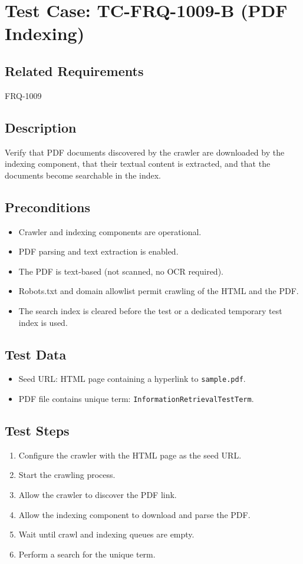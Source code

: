\documentclass{article}
\begin{document}
\section{Test Case: TC-FRQ-1009-B (PDF Indexing)}

\subsection*{Related Requirements}
FRQ-1009

\subsection*{Description}
Verify that PDF documents discovered by the crawler are downloaded by the indexing
component, that their textual content is extracted, and that the documents become
searchable in the index.

\subsection*{Preconditions}
\begin{itemize}
  \item Crawler and indexing components are operational.
  \item PDF parsing and text extraction is enabled.
  \item The PDF is text-based (not scanned, no OCR required).
  \item Robots.txt and domain allowlist permit crawling of the HTML and the PDF.
  \item The search index is cleared before the test or a dedicated temporary test index is used.
\end{itemize}

\subsection*{Test Data}
\begin{itemize}
  \item Seed URL: HTML page containing a hyperlink to \texttt{sample.pdf}.
  \item PDF file contains unique term: \texttt{InformationRetrievalTestTerm}.
\end{itemize}

\subsection*{Test Steps}
\begin{enumerate}
  \item Configure the crawler with the HTML page as the seed URL.
  \item Start the crawling process.
  \item Allow the crawler to discover the PDF link.
  \item Allow the indexing component to download and parse the PDF.
  \item Wait until crawl and indexing queues are empty.
  \item Perform a search for the unique term.
\end{enumerate}
\end{document}
